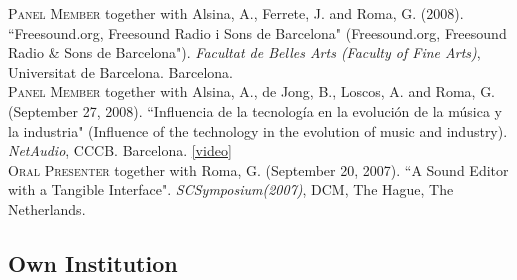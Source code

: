 \documentclass[10pt, a4paper]{article}
\newcommand{\years}[1]{\marginnote{\scriptsize #1}}
\begin{document}
{\years{2008b} \textsc{Panel Member} together with Alsina, A., Ferrete, J. and Roma, G. (2008). “Freesound.org, Freesound Radio i Sons de Barcelona" (Freesound.org, Freesound Radio \& Sons de Barcelona"). \emph{Facultat de Belles Arts (Faculty of Fine Arts)}, Universitat de Barcelona. Barcelona.\\
\years{2008a} \textsc{Panel Member} together with Alsina, A., de Jong, B., Loscos, A. and Roma, G. (September 27, 2008). “Influencia de la tecnología en la evolución de la música y la industria" (Influence of the technology in the evolution of music and industry). \emph{NetAudio}, CCCB. Barcelona. \href{https://www.youtube.com/watch?v=6JlCCvYXrHY}{[video]}\\
\years{2007}\textsc{Oral Presenter} together with Roma, G. (September 20, 2007). “A Sound Editor with a Tangible Interface". \emph{SCSymposium(2007)}, DCM, The Hague, The Netherlands.

\subsection*{Own Institution}
\noindent

}
\end{document}

